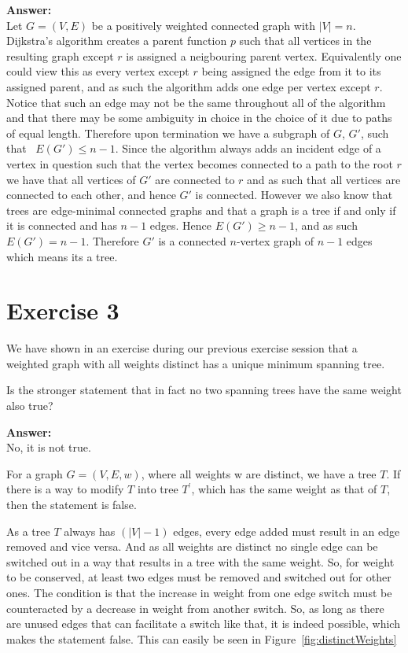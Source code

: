 \documentclass[nobib]{tufte-handout}
\newcounter{counter}
\begin{document}
  \textbf{Answer:} \\ 
  Let $G = (V, E)$ be a positively weighted connected graph with $|V| = n$. Dijkstra's algorithm creates a parent function $p$ such that all vertices in the resulting graph except $r$ is assigned a neigbouring parent vertex. Equivalently one could view this as every vertex except $r$ being assigned the edge from it to its assigned parent, and as such the algorithm adds one edge per vertex except $r$. Notice that such an edge may not be the same throughout all of the algorithm and that there may be some ambiguity in choice in the choice of it due to paths of equal length. Therefore upon termination we have a subgraph of $G$, $G'$, such that \ $E(G') \leq n - 1$. Since the algorithm always adds an incident edge of a vertex in question such that the vertex becomes connected to a path to the root $r$ we have that all vertices of $G'$ are connected to $r$ and as such that all vertices are connected to each other, and hence $G'$ is connected. However we also know that trees are edge-minimal connected graphs and that a graph is a tree if and only if it is connected and has $n - 1$ edges. Hence $E(G') \geq n - 1$, and as such $E(G') = n - 1$. Therefore $G'$ is a connected $n$-vertex graph of $n - 1$ edges which means its a tree.
\newpage

\section{Exercise 3}
We have shown in an exercise during our previous exercise session that a weighted graph with all weights distinct has a unique minimum spanning tree.

Is the stronger statement that in fact no two spanning trees have the same weight also true?

\textbf{Answer:} \\ 
No, it is not true.

For a graph $G = (V,E,w)$, where all weights w are distinct, we have a tree $T$. If there is a way to modify $T$ into tree $T^\prime$, which has the same weight as that of $T$, then the statement is false. 

As a tree $T$ always has $(|V|-1)$ edges, every edge added must result in an edge removed and vice versa. And as all weights are distinct no single edge can be switched out in a way that results in a tree with the same weight. So, for weight to be conserved, at least two edges must be removed and switched out for other ones. The condition is that the increase in weight from one edge switch must be counteracted by a decrease in weight from another switch. So, as long as there are unused edges that can facilitate a switch like that, it is indeed possible, which makes the statement false. This can easily be seen in Figure~\ref{fig:distinctWeights}
\end{document}
